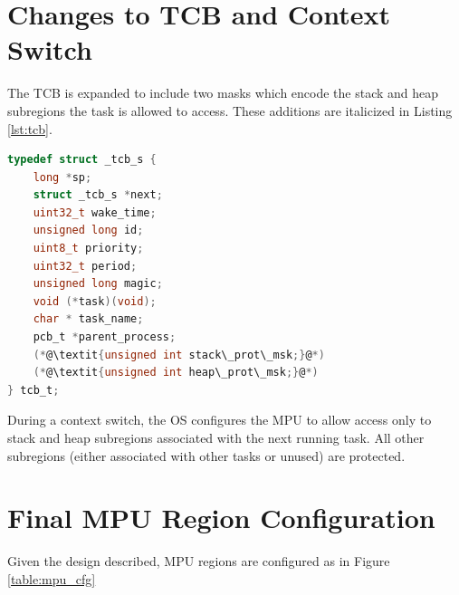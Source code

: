 \section{Changes to TCB and Context Switch}

The TCB is expanded to include two masks which encode the stack and heap subregions the task is allowed to access. These additions are italicized in Listing \ref{lst:tcb}.

\begin{lstlisting}[language=c, caption={TCB struct definition}, captionpos=b, label={lst:tcb}]
typedef struct _tcb_s {
    long *sp;
    struct _tcb_s *next;
    uint32_t wake_time;
    unsigned long id;
    uint8_t priority;
    uint32_t period;
    unsigned long magic;
    void (*task)(void);
    char * task_name;
    pcb_t *parent_process;
    (*@\textit{unsigned int stack\_prot\_msk;}@*)
    (*@\textit{unsigned int heap\_prot\_msk;}@*)
} tcb_t;
\end{lstlisting}

During a context switch, the OS configures the MPU to allow access only to stack and heap subregions associated with the next running task. All other subregions (either associated with other tasks or unused) are protected.

\section{Final MPU Region Configuration}

Given the design described, MPU regions are configured as in Figure \ref{table:mpu_cfg}

